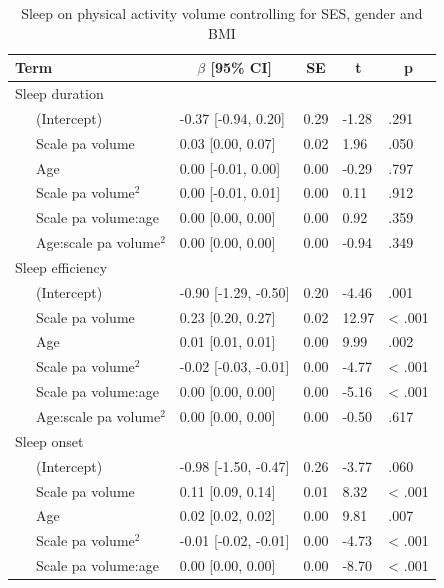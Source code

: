 \documentclass[
  man]{apa6}
\begin{document}
\begin{table}[tbp]

\begin{center}
\begin{threeparttable}

\caption{\label{tab:sleep-by-exercise}Sleep on physical activity volume controlling for SES, gender and BMI}

\begin{tabular}{lllll}
\toprule
Term & \multicolumn{1}{c}{$\beta$ [95\% CI]} & \multicolumn{1}{c}{SE} & \multicolumn{1}{c}{t} & \multicolumn{1}{c}{p}\\
\midrule
Sleep duration &  &  &  & \\
\ \ \ (Intercept) & -0.37 [-0.94, 0.20] & 0.29 & -1.28 & .291\\
\ \ \ Scale  pa  volume & 0.03 [0.00, 0.07] & 0.02 & 1.96 & .050\\
\ \ \ Age & 0.00 [-0.01, 0.00] & 0.00 & -0.29 & .797\\
\ \ \ Scale  pa  volume$^2$ & 0.00 [-0.01, 0.01] & 0.00 & 0.11 & .912\\
\ \ \ Scale  pa  volume:age & 0.00 [0.00, 0.00] & 0.00 & 0.92 & .359\\
\ \ \ Age:scale  pa  volume$^2$ & 0.00 [0.00, 0.00] & 0.00 & -0.94 & .349\\
Sleep efficiency &  &  &  & \\
\ \ \ (Intercept) & -0.90 [-1.29, -0.50] & 0.20 & -4.46 & .001\\
\ \ \ Scale  pa  volume & 0.23 [0.20, 0.27] & 0.02 & 12.97 & < .001\\
\ \ \ Age & 0.01 [0.01, 0.01] & 0.00 & 9.99 & .002\\
\ \ \ Scale  pa  volume$^2$ & -0.02 [-0.03, -0.01] & 0.00 & -4.77 & < .001\\
\ \ \ Scale  pa  volume:age & 0.00 [0.00, 0.00] & 0.00 & -5.16 & < .001\\
\ \ \ Age:scale  pa  volume$^2$ & 0.00 [0.00, 0.00] & 0.00 & -0.50 & .617\\
Sleep onset &  &  &  & \\
\ \ \ (Intercept) & -0.98 [-1.50, -0.47] & 0.26 & -3.77 & .060\\
\ \ \ Scale  pa  volume & 0.11 [0.09, 0.14] & 0.01 & 8.32 & < .001\\
\ \ \ Age & 0.02 [0.02, 0.02] & 0.00 & 9.81 & .007\\
\ \ \ Scale  pa  volume$^2$ & -0.01 [-0.02, -0.01] & 0.00 & -4.73 & < .001\\
\ \ \ Scale  pa  volume:age & 0.00 [0.00, 0.00] & 0.00 & -8.70 & < .001\\

\end{tabular}
\end{threeparttable}
\end{center}
\end{table}
\end{document}
